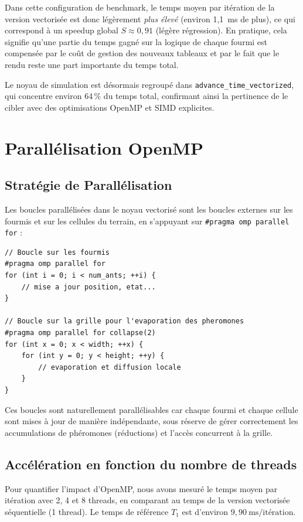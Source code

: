 \documentclass[12pt,a4paper]{article}
\begin{document}
Dans cette configuration de benchmark, le temps moyen par itération de la version vectorisée est donc légèrement \emph{plus élevé} (environ 1,1~ms de plus), ce qui correspond à un speedup global \(S \approx 0{,}91\) (légère régression). En pratique, cela signifie qu'une partie du temps gagné sur la logique de chaque fourmi est compensée par le coût de gestion des nouveaux tableaux et par le fait que le rendu reste une part importante du temps total.

Le noyau de simulation est désormais regroupé dans \texttt{advance\_time\_vectorized}, qui concentre environ 64\,\% du temps total, confirmant ainsi la pertinence de le cibler avec des optimisations OpenMP et SIMD explicites.

\section{Parallélisation OpenMP}
\label{sec:openmp}

\subsection{Stratégie de Parallélisation}
Les boucles parallélisées dans le noyau vectorisé sont les boucles externes sur les fourmis et sur les cellules du terrain, en s'appuyant sur \texttt{\#pragma omp parallel for} :

\begin{lstlisting}
// Boucle sur les fourmis
#pragma omp parallel for
for (int i = 0; i < num_ants; ++i) {
    // mise a jour position, etat...
}

// Boucle sur la grille pour l'evaporation des pheromones
#pragma omp parallel for collapse(2)
for (int x = 0; x < width; ++x) {
    for (int y = 0; y < height; ++y) {
        // evaporation et diffusion locale
    }
}
\end{lstlisting}

Ces boucles sont naturellement parallélisables car chaque fourmi et chaque cellule sont mises à jour de manière indépendante, sous réserve de gérer correctement les accumulations de phéromones (réductions) et l'accès concurrent à la grille.

\subsection{Accélération en fonction du nombre de threads}

Pour quantifier l'impact d'OpenMP, nous avons mesuré le temps moyen par itération avec 2, 4 et 8 threads, en comparant au temps de la version vectorisée séquentielle (1 thread). Le temps de référence $T_1$ est d'environ $9{,}90~\text{ms/itération}$.
\end{document}
